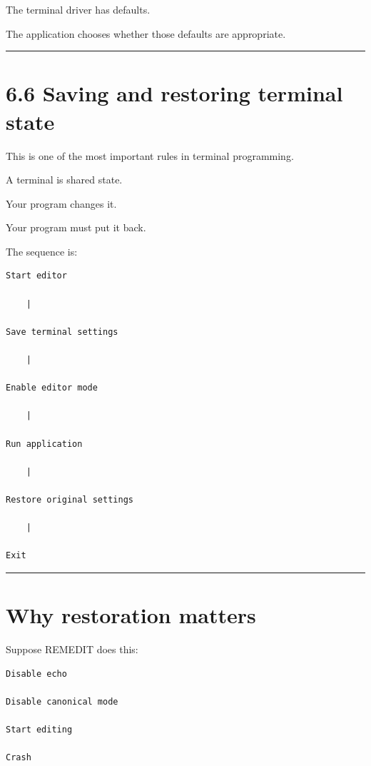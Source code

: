 \documentclass[
  oneside,
  openany]{book}
\begin{document}
The terminal driver has defaults.

The application chooses whether those defaults are appropriate.

\begin{center}\rule{0.5\linewidth}{0.5pt}\end{center}

\hypertarget{saving-and-restoring-terminal-state}{%
\section{6.6 Saving and restoring terminal
state}\label{saving-and-restoring-terminal-state}}

This is one of the most important rules in terminal programming.

A terminal is shared state.

Your program changes it.

Your program must put it back.

The sequence is:

\begin{verbatim}
Start editor

    |

Save terminal settings

    |

Enable editor mode

    |

Run application

    |

Restore original settings

    |

Exit
\end{verbatim}

\begin{center}\rule{0.5\linewidth}{0.5pt}\end{center}

\hypertarget{why-restoration-matters}{%
\section{Why restoration matters}\label{why-restoration-matters}}

Suppose REMEDIT does this:

\begin{verbatim}
Disable echo

Disable canonical mode

Start editing

Crash
\end{verbatim}
\end{document}
